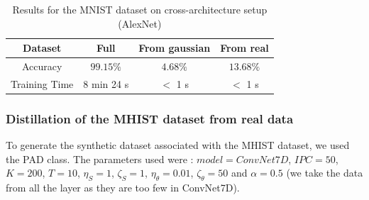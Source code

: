 \documentclass[onecolumn]{IEEEtran}
\begin{document}
\begin{table}[H]
    \centering
    \begin{tabular}{|c|c|c|c|}
        \hline
        Dataset & Full & From gaussian & From real \\
        \hline
        Accuracy & $99.15\%$ & $4.68\%$ & $13.68\%$ \\
        \hline
        Training Time & 8 min 24 s & $<$ 1 s & $<$ 1 s \\
        \hline
    \end{tabular}
    \caption{Results for the MNIST dataset on cross-architecture setup (AlexNet)}
    \label{tab:MNIST_pad_results_cross_architecture}
\end{table}

\subsubsection{Distillation of the MHIST dataset from real data}
To generate the synthetic dataset associated with the MHIST dataset, we used the PAD class. The parameters used were : $model = ConvNet7D$, $IPC = 50$, $K=200$, $T=10$, $\eta_S = 1$, $\zeta_S = 1$, $\eta_\theta = 0.01$, $\zeta_\theta=50$ and $\alpha=0.5$ (we take the data from all the layer as they are too few in ConvNet7D).
\end{document}
